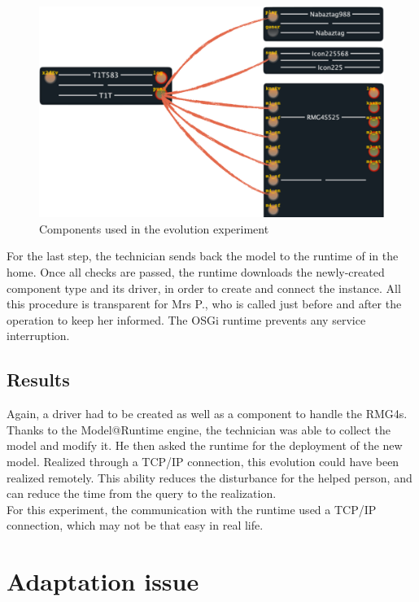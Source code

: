 \begin{figure}[h!]
\centering
\includegraphics[width=\textwidth]{part4/pics/validEvol}
\caption{Components used in the evolution experiment}
\label{fig:validEvol}
\end{figure}

For the last step, the technician sends back the model to the runtime of \enti{} in the home. Once all checks are passed, the runtime downloads the newly-created component type and its driver, in order to create and connect the instance. All this procedure is transparent for Mrs P., who is called just before and after the operation to keep her informed. The OSGi runtime prevents any service interruption.

\subsection{Results}

Again, a driver had to be created as well as a component to handle the RMG4s. Thanks to the Model@Runtime engine, the technician was able to collect the model and modify it. He then asked the runtime for the deployment of the new model. Realized through a TCP/IP connection, this evolution could have been realized remotely. This ability reduces the disturbance for the helped person, and can reduce the time from the query to the realization.\\
For this experiment, the communication with the runtime used a TCP/IP connection, which may not be that easy in real life.


\section{Adaptation issue}
\label{subsec:adaptation}

